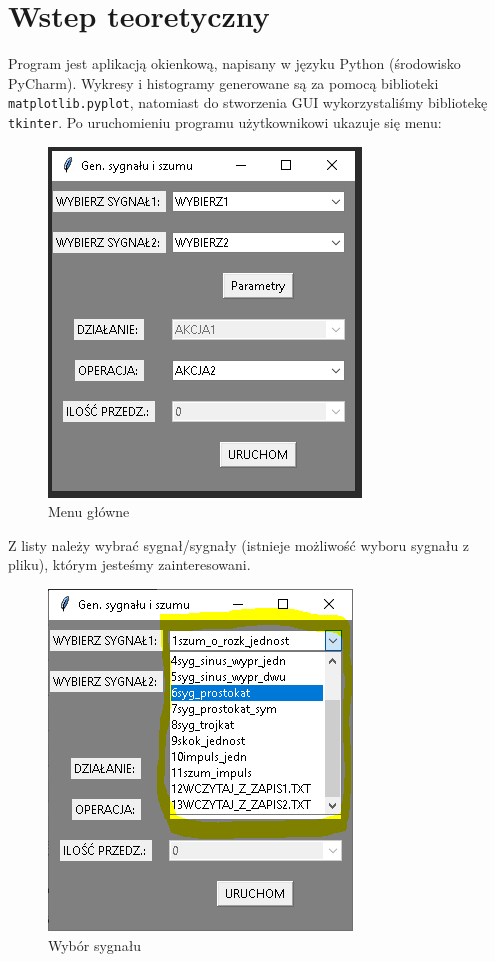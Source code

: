 \documentclass[12pt]{article}
\begin{document}
\section{Wstep teoretyczny}
Program jest aplikacją okienkową, napisany w języku Python (środowisko PyCharm). Wykresy i histogramy generowane są za pomocą biblioteki  \texttt{matplotlib.pyplot}, natomiast 
do stworzenia GUI wykorzystaliśmy bibliotekę  \texttt{tkinter}. Po uruchomieniu programu użytkownikowi ukazuje się menu:
\begin{figure}[H]
\centering
\includegraphics[scale=0.8]{menu11.png}
\caption{Menu główne}
\end{figure}
Z listy należy wybrać sygnał/sygnały (istnieje możliwość wyboru sygnału z pliku), którym jesteśmy zainteresowani. 
\begin{figure}[H]
\centering
\includegraphics[scale=0.8]{menu12.png}
\caption{Wybór sygnału}
\end{figure}
\end{document}
